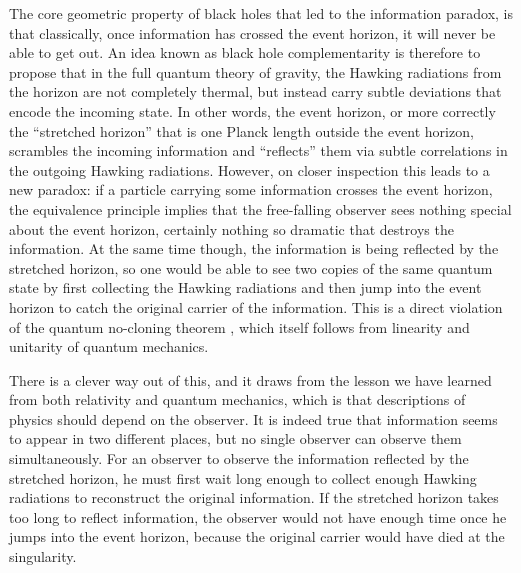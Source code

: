 \documentclass{brownthesis}
\begin{document}
The core geometric property of black holes that led to the information paradox,
is that classically, once information has crossed the event horizon, it will never be
able to get out. An idea known as black hole complementarity \cite{PhysRevD.48.3743}
is therefore to propose that in the full quantum theory of gravity,
the Hawking radiations from the horizon are not completely thermal,
but instead carry subtle deviations that encode the incoming state. In other words, the
event horizon, or more correctly the ``stretched horizon'' that is one Planck length outside
the event horizon, scrambles the incoming information and ``reflects'' them via subtle
correlations in the outgoing Hawking radiations. However, on closer inspection this leads
to a new paradox: if a particle carrying some information crosses the event horizon,
the equivalence principle implies that the free-falling observer sees nothing special
about the event horizon, certainly nothing so dramatic that destroys the information.
At the same time though, the information is being reflected by the stretched horizon,
so one would be able to see two copies of the same quantum state by first collecting
the Hawking radiations and then jump into the event horizon to catch the original
carrier of the information. This is a direct violation
of the quantum no-cloning theorem \cite{nielsen2001quantum}, which itself follows from
linearity and unitarity of quantum mechanics.

There is a clever way out of this, and it draws from the lesson we
have learned from both relativity and quantum mechanics, which is that descriptions
of physics should depend on the observer. It is indeed true that information seems to
appear in two different places, but no single observer can observe them simultaneously.
For an observer to observe the information reflected by the stretched horizon, he
must first wait long enough to collect enough Hawking radiations to reconstruct the original
information. If the stretched horizon takes too long to reflect information, the observer
would not have enough time once he jumps into the event horizon, because the original
carrier would have died at the singularity.
\end{document}
